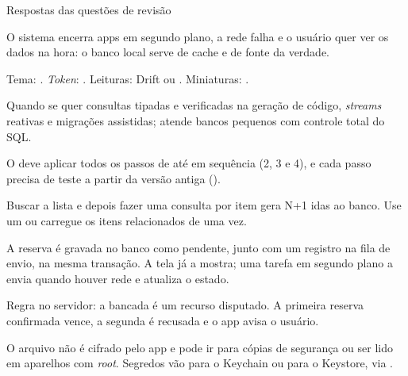 \documentclass[aspectratio=169,10pt]{beamer}
\begin{document}
\begin{frame}{Respostas das questões de revisão}
  \begin{respostas}
    \item O sistema encerra apps em segundo plano, a rede falha e o usuário quer ver os dados na hora: o banco local serve de cache e de fonte da verdade.
    \item Tema: . \emph{Token}: . Leituras: Drift ou . Miniaturas: .
    \item Quando se quer consultas tipadas e verificadas na geração de código, \emph{streams} reativas e migrações assistidas;  atende bancos pequenos com controle total do SQL.
    \item O  deve aplicar todos os passos de  até  em sequência (2, 3 e 4), e cada passo precisa de teste a partir da versão antiga ().
    \item Buscar a lista e depois fazer uma consulta por item gera N+1 idas ao banco. Use um  ou carregue os itens relacionados de uma vez.
    \item A reserva é gravada no banco como pendente, junto com um registro na fila de envio, na mesma transação. A tela já a mostra; uma tarefa em segundo plano a envia quando houver rede e atualiza o estado.
    \item Regra no servidor: a bancada é um recurso disputado. A primeira reserva confirmada vence, a segunda é recusada e o app avisa o usuário.
    \item O arquivo não é cifrado pelo app e pode ir para cópias de segurança ou ser lido em aparelhos com \emph{root}. Segredos vão para o Keychain ou para o Keystore, via .
  \end{respostas}
\end{frame}

\end{document}
